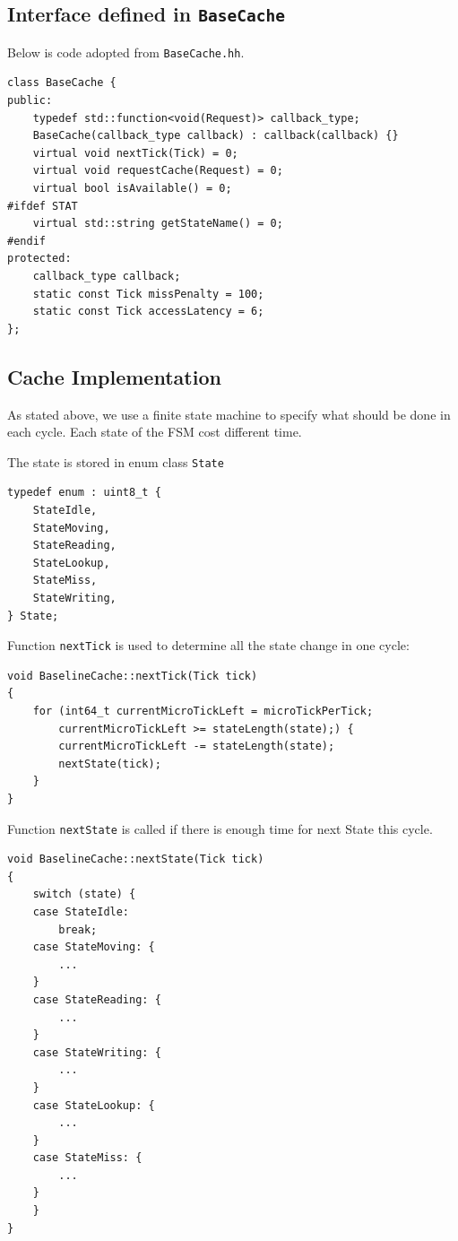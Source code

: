 \documentclass[11pt]{article}
\begin{document}
\subsection{Interface defined in \texttt{BaseCache}}

Below is code adopted from \texttt{BaseCache.hh}.

\begin{verbatim}
class BaseCache {
public:
    typedef std::function<void(Request)> callback_type;
    BaseCache(callback_type callback) : callback(callback) {}
    virtual void nextTick(Tick) = 0;
    virtual void requestCache(Request) = 0;
    virtual bool isAvailable() = 0;
#ifdef STAT
    virtual std::string getStateName() = 0;
#endif
protected:
    callback_type callback;
    static const Tick missPenalty = 100;
    static const Tick accessLatency = 6;
};
\end{verbatim}

\subsection{Cache Implementation}

As stated above, we use a finite state machine to specify what should be done in each cycle. Each state of the FSM cost different time.

The state is stored in enum class \texttt{State}

\begin{verbatim}
typedef enum : uint8_t {
    StateIdle,
    StateMoving,
    StateReading,
    StateLookup,
    StateMiss,
    StateWriting,
} State;
\end{verbatim}

Function \texttt{nextTick} is used to determine all the state change in one cycle:

\begin{verbatim}
void BaselineCache::nextTick(Tick tick)
{
    for (int64_t currentMicroTickLeft = microTickPerTick;
        currentMicroTickLeft >= stateLength(state);) {
        currentMicroTickLeft -= stateLength(state);
        nextState(tick);
    }
}
\end{verbatim}

Function \texttt{nextState} is called if there is enough time for next State this cycle.

\begin{verbatim}
void BaselineCache::nextState(Tick tick)
{
    switch (state) {
    case StateIdle:
        break;
    case StateMoving: {
        ...
    }
    case StateReading: {
        ...
    }
    case StateWriting: {
        ...
    }
    case StateLookup: {
        ...
    }
    case StateMiss: {
        ...
    }
    }
}
\end{verbatim}
\end{document}
